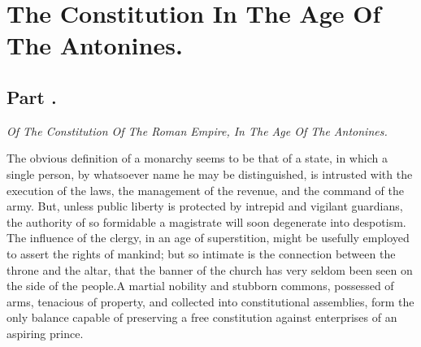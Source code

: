 \chapter{The Constitution In The Age Of The Antonines.}
\section{Part \thesection.}

\textit{Of The Constitution Of The Roman Empire, In The Age Of The
Antonines.}
\vspace{\onelineskip}

The obvious definition of a monarchy seems to be that of a state,
in which a single person, by whatsoever name he may be
distinguished, is intrusted with the execution of the laws, the
management of the revenue, and the command of the army. But,
unless public liberty is protected by intrepid and vigilant
guardians, the authority of so formidable a magistrate will soon
degenerate into despotism. The influence of the clergy, in an age
of superstition, might be usefully employed to assert the rights
of mankind; but so intimate is the connection between the throne
and the altar, that the banner of the church has very seldom been
seen on the side of the people.\footnotemark[101] A martial nobility and
stubborn commons, possessed of arms, tenacious of property, and
collected into constitutional assemblies, form the only balance
capable of preserving a free constitution against enterprises of
an aspiring prince.


